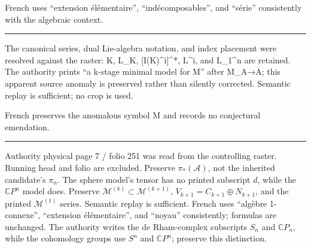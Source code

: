 \documentclass[
  english,
  a3paper,
  a3paper]{extarticle}
\begin{document}
French uses ``extension élémentaire'', ``indécomposables'', and
``série'' consistently with the algebraic context.

\clearpage



\par

\vspace{0.7mm}\hrule\vspace{1.6mm}

\fontsize{11}{14}\selectfont

The canonical series, dual Lie-algebra notation, and index placement
were resolved against the raster: K, L\_K, {[}I(K)\^{}i{]}\^{}*, L\^{}i,
and L\_1\^{}n are retained. The authority prints ``a k-stage minimal
model for M'' after M\_A→A; this apparent source anomaly is preserved
rather than silently corrected. Semantic replay is sufficient; no crop
is used.

French preserves the anomalous symbol M and records no conjectural
emendation.

\clearpage



\par

\vspace{0.7mm}\hrule\vspace{1.6mm}

\fontsize{11}{14}\selectfont

Authority physical page 7 / folio 251 was read from the controlling
raster. Running head and folio are excluded. Preserve
\(\pi_*(\mathscr A)\), not the inherited candidate's \(\pi_n\). The
sphere model's tensor has no printed subscript \(d\), while the
\(\mathbb CP^n\) model does. Preserve
\(\mathcal M^{(k)}\subset\mathcal M^{(k+1)}\),
\(V_{k+1}=C_{k+1}\oplus N_{k+1}\), and the printed \(\mathcal M^{(1)}\)
series. Semantic replay is sufficient. French uses ``algèbre
1-connexe'', ``extension élémentaire'', and ``noyau'' consistently;
formulas are unchanged. The authority writes the de Rham-complex
subscripts \(S_n\) and \(\mathbb CP_n\), while the cohomology groups use
\(S^n\) and \(\mathbb CP^n\); preserve this distinction.

\clearpage
\end{document}
